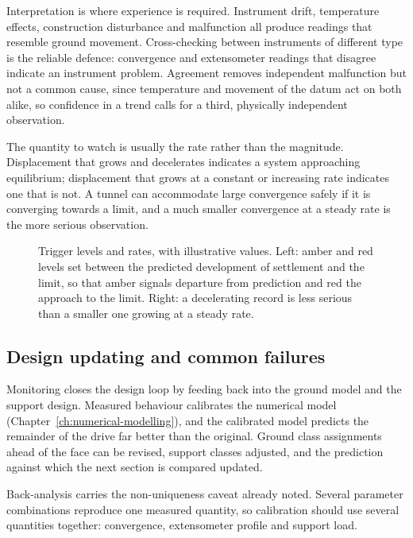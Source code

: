 Interpretation is where experience is required. Instrument drift, temperature
effects, construction disturbance and malfunction all produce readings
that resemble ground movement. Cross-checking between instruments of different
type is the reliable defence: convergence and extensometer readings that
disagree indicate an instrument problem. Agreement removes independent
malfunction but not a common cause, since temperature and movement of the
datum act on both alike, so confidence in a trend calls for a third,
physically independent observation.

The quantity to watch is usually the rate rather than the magnitude.
Displacement that grows and decelerates indicates a system approaching
equilibrium; displacement that grows at a constant or increasing rate
indicates one that is not. A tunnel can accommodate large convergence safely if it is converging
towards a limit, and a much smaller convergence at a steady rate is the more
serious observation.

\begin{figure}[htbp]
\centering
{}
\caption{Trigger levels and rates, with illustrative values. Left: amber and red levels set between the predicted development of settlement and the limit, so that amber signals departure from prediction and red the approach to the limit. Right: a decelerating record is less serious than a smaller one growing at a steady rate.}
\label{fig:trigger-levels}
\end{figure}

\subsection{Design updating and common failures}
\label{sec:updating-failures}

Monitoring closes the design loop by feeding back into the ground model and
the support design. Measured behaviour calibrates the numerical model
(Chapter~\ref{ch:numerical-modelling}), and the calibrated model predicts the
remainder of the drive far better than the original. Ground class assignments
ahead of the face can be revised, support classes adjusted, and the prediction
against which the next section is compared updated.

Back-analysis carries the non-uniqueness caveat already noted. Several
parameter combinations reproduce one measured quantity, so calibration should
use several quantities together: convergence, extensometer profile and support
load.

